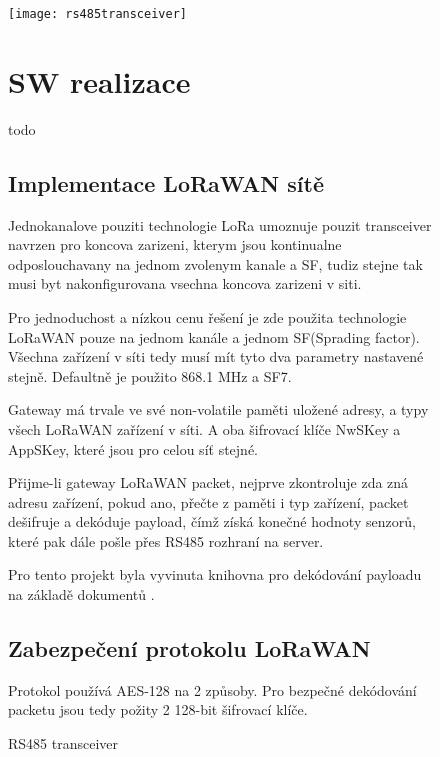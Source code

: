 \begin{figure}[!h]
    \centering
    \texttt{[image: rs485transceiver]}
    \caption{RS485 transceiver \cite{rs485tr}}
    \label{fig:rs485transceiver}
\newpage
\section{SW realizace}


todo




\subsection{Implementace LoRaWAN sítě}

Jednokanalove pouziti technologie LoRa umoznuje pouzit transceiver navrzen pro koncova zarizeni, kterym jsou kontinualne odposlouchavany na jednom zvolenym kanale a SF, tudiz stejne tak musi byt nakonfigurovana vsechna koncova zarizeni v siti.









Pro jednoduchost a nízkou cenu řešení je zde použita technologie LoRaWAN pouze na jednom kanále a jednom SF(Sprading factor). Všechna zařízení v síti tedy musí mít tyto dva parametry nastavené stejně. Defaultně je použito 868.1 MHz a SF7.

Gateway má trvale ve své non-volatile paměti uložené adresy, a typy všech LoRaWAN zařízení v síti. A oba šifrovací klíče NwSKey a AppSKey, které jsou pro celou síť stejné.

Přijme-li gateway LoRaWAN packet, nejprve zkontroluje zda zná adresu zařízení, pokud ano, přečte z paměti i typ zařízení, packet dešifruje a dekóduje payload, čímž získá konečné hodnoty senzorů, které pak dále pošle přes RS485 rozhraní na server.

Pro tento projekt byla vyvinuta knihovna pro dekódování payloadu na základě dokumentů \cite{lwSpec} \cite{lwSecur}.

\subsection{Zabezpečení protokolu LoRaWAN}
Protokol používá AES-128 na 2 způsoby. Pro bezpečné dekódování packetu jsou tedy požity 2 128-bit šifrovací klíče.


\end{figure}
